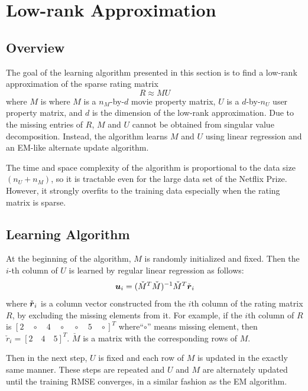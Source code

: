 \documentclass{article}
\begin{document}
\fi

\section{Low-rank Approximation}

\subsection{Overview}
The goal of the learning algorithm presented in this section is to find a low-rank approximation of the sparse rating matrix 
\begin{equation}
R \approx MU
\end{equation}
where $M$ is where $M$ is a $n_M$-by-$d$ movie property matrix, $U$ is a
$d$-by-$n_U$ user property matrix, and $d$ is the dimension of the
low-rank approximation. Due to the missing entries of $R$, $M$ and $U$
cannot be obtained from singular value decomposition. Instead, the
algorithm learns $M$ and $U$ using linear regression and an EM-like
alternate update algorithm.

The time and space complexity of the algorithm is proportional to the
data size $(n_U+n_M)$, so it is tractable even for the large data set
of the Netflix Prize. However, it strongly overfits to the training
data especially when the rating matrix is sparse.

\subsection{Learning Algorithm}

At the beginning of the algorithm, $M$ is randomly initialized and
fixed. Then the $i$-th column of $U$ is learned by regular linear
regression as follows:
\begin{equation}
{\mbox{\boldmath $u$}}_i=(\check{M}^T\check{M})^{-1}\check{M}^T \check{{\mbox{\boldmath $r$}}}_i
\label{eq:lrem_core}
\end{equation}
where $\check{{\mbox{\boldmath $r$}}}_i$ is a column vector constructed from the $i$th column of the rating matrix $R$, by excluding the missing elements from it. For example, if the $i$th column of $R$ is $[2 \quad \circ \quad 4 \quad \circ \quad \circ \quad 5 \quad \circ]^T$ where``$\circ$'' means missing element, then $\check{r}_i = [2 \quad 4 \quad 5]^T$. $\check{M}$ is a matrix with the corresponding rows of $M$.

Then in the next step, $U$ is fixed and each row of $M$ is updated in
the exactly same manner. These steps are repeated and $U$ and $M$ are
alternately updated until the training RMSE converges, in a similar
fashion as the EM algorithm.
\end{document}
